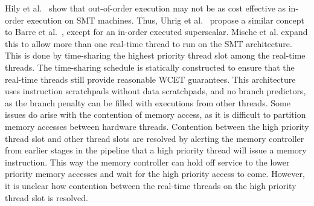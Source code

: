 Hily et al.~\cite{Hily1999} show that out-of-order execution may not be as cost effective as in-order execution on SMT machines.
Thus, Uhrig et al.~\cite{SaschaUhrig2005SMT} propose a similar concept to Barre et al.~\cite{Barre2008RTSMT}, except for an in-order executed superscalar.
Mische et al.\cite{Mische2008SMT} expand this to allow more than one real-time thread to run on the SMT architecture.
This is done by time-sharing the highest priority thread slot among the real-time threads.  
The time-sharing schedule is statically constructed to ensure that the real-time threads still provide reasonable WCET guarantees. 
This architecture uses instruction scratchpads without data scratchpads, and no branch predictors, as the branch penalty can be filled with executions from other threads.   
Some issues do arise with the contention of memory access, as it is difficult to partition memory accesses between hardware threads.
Contention between the high priority thread slot and other thread slots are resolved by alerting the memory controller from earlier stages in the pipeline that a high priority thread will issue a memory instruction. 
This way the memory controller can hold off service to the lower priority memory accesses and wait for the high priority access to come.     
However, it is unclear how contention between the real-time threads on the high priority thread slot is resolved.
 

